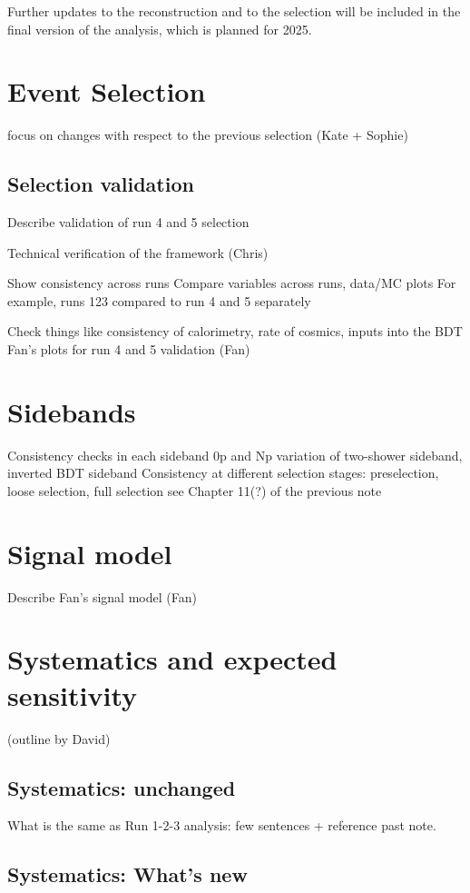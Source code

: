 \documentclass{article}
\begin{document}
Further updates to the reconstruction and to the selection will be included in the final version of the analysis, which is planned for 2025.

\section{Event Selection}
focus on changes with respect to the previous selection
(Kate + Sophie)

\subsection{Selection validation}
\label{sec:selvalid}
Describe validation of run 4 and 5 selection

Technical verification of the framework (Chris)

Show consistency across runs
Compare variables across runs, data/MC plots 
For example, runs 123 compared to run 4 and 5 separately

Check things like consistency of calorimetry, rate of cosmics, inputs into the BDT
Fan's plots for run 4 and 5 validation (Fan)

\newpage
\section{Sidebands}
\label{sec:sidebands}
Consistency checks in each sideband
0p and Np variation of two-shower sideband, inverted BDT sideband
Consistency at different selection stages:
preselection, loose selection, full selection
see Chapter 11(?) of the previous note

\section{Signal model}
Describe Fan's signal model (Fan)

\section{Systematics and expected sensitivity}
(outline by David)

\subsection{Systematics: unchanged}What is the same as Run 1-2-3 analysis: few sentences + reference past note.
\subsection{Systematics: What's new}
\end{document}
